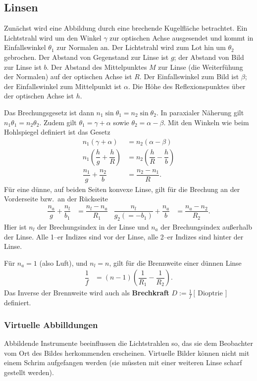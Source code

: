 \documentclass[a4paper,12pt]{article}
\numberwithin{equation}{section}
\begin{document}
\subsection{Linsen}
Zunächst wird eine Abbildung durch eine brechende Kugelfläche betrachtet. Ein Lichtstrahl wird um den Winkel $\gamma $ zur optischen Achse ausgesendet und kommt in Einfallswinkel $\theta _1$ zur Normalen an. Der Lichtstrahl wird zum Lot hin um $\theta _2$ gebrochen. Der Abstand von Gegenstand zur Linse ist $g$; der Abstand von Bild zur Linse ist $b$. Der Abstand des Mittelpunktes $M$ zur Linse (die Weiterfühung der Normalen) auf der optischen Achse ist $R$. Der Einfallswinkel zum Bild ist $\beta $; der Einfallswinkel zum Mittelpunkt ist $\alpha $. Die Höhe des Reflexionspunktes über der optischen Achse ist $h$.\par
Das Brechungsgesetz ist dann $n_1\sin \theta _1=n_2\sin \theta _2$. In paraxialer Näherung gilt $n_1\theta _1=n_2\theta _2$. Zudem gilt $\theta _1=\gamma +\alpha $ sowie $\theta _2=\alpha -\beta $. Mit den Winkeln wie beim Hohlspiegel definiert ist das Gesetz
\begin{align} 
        n_1\left(\gamma +\alpha \right)&=n_2\left(\alpha -\beta \right)\\
        n_1\left(\dfrac{h}{g}+\dfrac{h}{R}\right)&=n_2\left(\dfrac{h}{R}-\dfrac{h}{b}\right)\\
        \dfrac{n_1}{g}+\dfrac{n_2}{b}&=\dfrac{n_2-n_1}{R}
.\end{align} 
Für eine dünne, auf beiden Seiten konvexe Linse, gilt für die Brechung an der Vorderseite bzw.\ an der Rückseite
\begin{align} 
        \dfrac{n_a}{g}+\dfrac{n_l}{b_1}&=\dfrac{n_l-n_a}{R_1}&\dfrac{n_l}{g_2(=-b_1)}+\dfrac{n_a}{b}&=\dfrac{n_a-n_2}{R_2}
.\end{align} 
Hier ist $n_l$ der Brechungsindex in der Linse und $n_a$ der Brechungsindex außerhalb der Linse. Alle 1--er Indizes sind vor der Linse, alle 2--er Indizes sind hinter der Linse.\par
Für $n_a=1$ (also Luft), und $n_l=n$, gilt für die Brennweite einer dünnen Linse
\begin{align} 
        \dfrac{1}{f}&=\left(n-1\right)\left(\dfrac{1}{R_1}-\dfrac{1}{R_2}\right)
.\end{align}
Das Inverse der Brennweite wird auch als \textbf{Brechkraft} $D:=\tfrac{1}{f}[\,\text{Dioptrie}\,]$ definiert.

\subsubsection{Virtuelle Abbilldungen}
Abbildende Instrumente beeinflussen die Lichtstrahlen so, das sie dem Beobachter vom Ort des Bildes herkommenden erscheinen.
Virtuelle Bilder können nicht mit einem Schrim aufgefangen werden (sie müssten mit einer weiteren Linse scharf gestellt werden).\par
\end{document}
